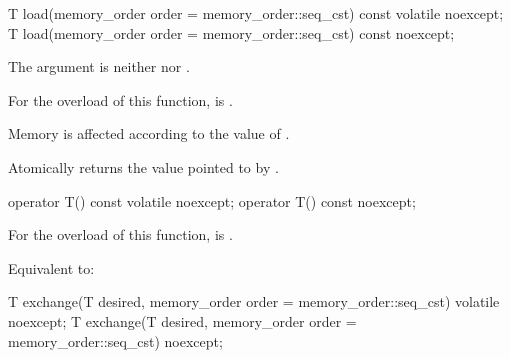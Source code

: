 %
%
%
%
%
%
\begin{itemdecl}
T load(memory_order order = memory_order::seq_cst) const volatile noexcept;
T load(memory_order order = memory_order::seq_cst) const noexcept;
\end{itemdecl}

\begin{itemdescr}
\pnum
\expects
The  argument is neither  nor .

\pnum
\constraints
For the  overload of this function,
 is .

\pnum
\effects
Memory is affected according to the value of .

\pnum
\returns
Atomically returns the value pointed to by .
\end{itemdescr}

%
%
%
%
\begin{itemdecl}
operator T() const volatile noexcept;
operator T() const noexcept;
\end{itemdecl}

\begin{itemdescr}
\pnum
\constraints
For the  overload of this function,
 is .

\pnum
\effects
Equivalent to: 
\end{itemdescr}


%
%
%
%
%
%
\begin{itemdecl}
T exchange(T desired, memory_order order = memory_order::seq_cst) volatile noexcept;
T exchange(T desired, memory_order order = memory_order::seq_cst) noexcept;
\end{itemdecl}

